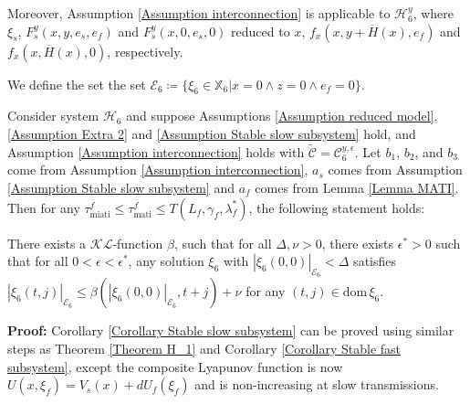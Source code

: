 Moreover, Assumption \ref{Assumption interconnection} is applicable to $\mathcal{H}_6^y$, where $\xi_s$, $F_s^y(x,y,e_s,e_f)$ and $F_s^y(x,0,e_s,0)$ reduced to $x$, $f_x(x,y+\overline{H}(x),e_f)$ and $f_x(x,\overline{H}(x),0)$, respectively.



We define the set the set $\mathcal{E}_6 \coloneqq \{\xi_6 \in \mathbb{X}_6 | x=0 \wedge z = 0 \wedge e_f=0 \}$.
\begin{cor}
    Consider system $\mathcal{H}_6$ and suppose Assumptions \ref{Assumption reduced model}, \ref{Assumption Extra 2} and \ref{Assumption Stable slow subsystem} hold, and Assumption \ref{Assumption interconnection} holds with $\widetilde{\mathcal{C}} = \mathcal{C}_6^{y,\epsilon}$.
    Let $b_1$, $b_2$, and $b_3$ come from Assumption \ref{Assumption interconnection}, $a_s$ comes from Assumption \ref{Assumption Stable slow subsystem} and $a_f$ comes from Lemma \ref{Lemma MATI}. Then for any $\tau_{\text{miati}}^f \leq \tau_{\text{mati}}^f \leq T(L_f, \gamma_f, \lambda_f^*)$, the following statement holds:

    There exists a $\mathcal{KL}$-function $\beta$, such that for all $\Delta,\nu>0$, there exists $\epsilon^* >0$ such that for all $0<\epsilon<\epsilon^*$, any solution $\xi_6$ with $ |\xi_6(0,0)|_{\mathcal{E}_6}<\Delta$ satisfies $|\xi_6(t,j)|_{\mathcal{E}_6} \leq \beta(|\xi_6(0,0)|_{\mathcal{E}_6}, t+j) + \nu$ for any $(t,j)\in \text{dom} \, \xi_6$.
    
    \label{Corollary Stable slow subsystem}
\end{cor}
\textbf{Proof:}
    Corollary \ref{Corollary Stable slow subsystem} can be proved using similar steps as Theorem \ref{Theorem H_1} and Corollary \ref{Corollary Stable fast subsystem}, except the composite Lyapunov function is now $U(x,\xi_f) = V_s(x) + dU_f(\xi_f) $ and is non-increasing at slow transmissions.

